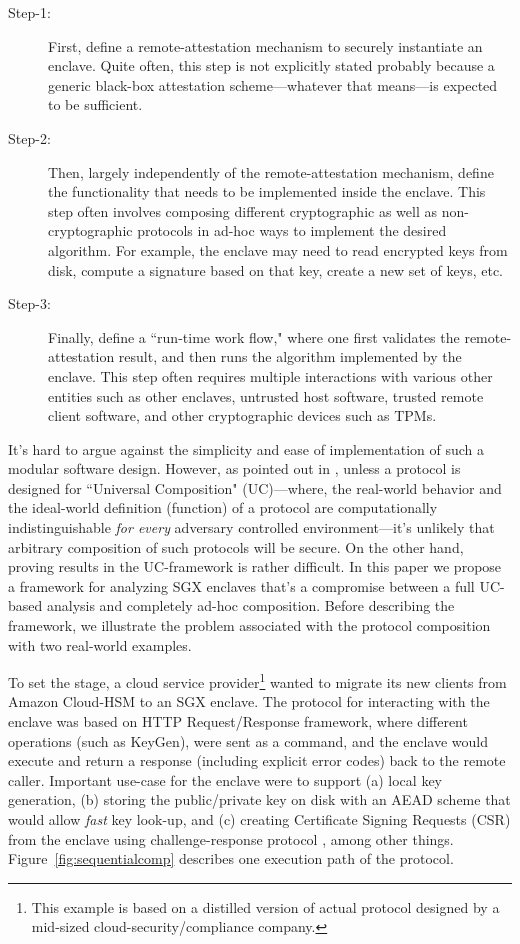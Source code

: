 \documentclass[10pt, letterpaper]{article}
\newcommand{\uc}{\textsf{UC}}
\begin{document}
  \begin{description}
    \item[Step-1:] First, define a remote-attestation mechanism to
      securely instantiate an enclave. Quite often, this step is not
      explicitly stated probably because a generic black-box
      attestation scheme---whatever that means---is expected to be
      sufficient.
    \item[Step-2:] Then, largely independently of the
      remote-attestation mechanism, define the functionality that needs
      to be implemented inside the enclave. This step often involves
      composing different cryptographic as well as non-cryptographic
      protocols in ad-hoc ways to implement the desired algorithm. For
      example, the enclave may need to read encrypted keys from disk,
      compute a signature based on that key, create a new set of keys,
      etc.
    \item[Step-3:] Finally, define a ``run-time work flow," where one
      first validates the remote-attestation result, and then runs the
      algorithm implemented by the enclave. This step often requires
      multiple interactions with various other entities such as other
      enclaves, untrusted host software, trusted remote client
      software, and other cryptographic devices such as TPMs.
  \end{description}

  It's hard to argue against the simplicity and ease of implementation
  of such a modular software design. However, as pointed out in
  \cite{ucframework}, unless a protocol is designed for
  ``\textsf{Universal Composition}" (\uc)---where, the real-world
  behavior and the ideal-world definition (function) of a protocol are
  computationally indistinguishable \textit{for every} adversary
  controlled environment---it's unlikely that arbitrary composition of
  such protocols will be secure. On the other hand, proving results in
  the \uc-framework is rather difficult. In this paper we propose a
  framework for analyzing SGX enclaves that's a compromise between a
  full \uc-based analysis and completely ad-hoc composition. Before
  describing the framework, we illustrate the problem associated with
  the protocol composition with two real-world examples.

  To set the stage, a cloud service provider\footnote{This example is
    based on a distilled version of actual protocol designed by a
    mid-sized cloud-security/compliance company.} wanted to migrate
  its new clients from Amazon Cloud-HSM to an SGX enclave. The
  protocol for interacting with the enclave was based on HTTP
  Request/Response framework, where different operations (such as
  \textsf{KeyGen}), were sent as a command, and the enclave would
  execute and return a response (including explicit error codes) back
  to the remote caller.  Important use-case for the enclave were to
  support (a) local key generation, (b) storing the public/private key
  on disk with an AEAD scheme that would allow \textit{fast}
  key look-up, and (c) creating Certificate Signing Requests (CSR) from
  the enclave using challenge-response protocol
  \cite[\S5.2.8.3]{rfc4210}, among other
  things. Figure~\ref{fig:sequentialcomp} describes one execution path
  of the protocol.
\end{document}
